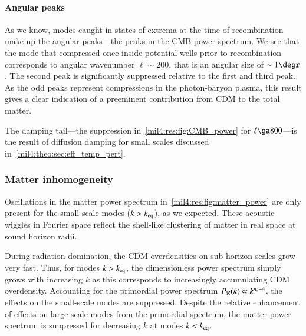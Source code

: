 





\paragraph{Angular peaks}
As we know, modes caught in states of extrema at the time of recombination make up the angular peaks---the peaks in the CMB power spectrum. We see that the mode that compressed once inside potential wells prior to recombination corresponds to angular wavenumber $\ell\sim 200$, that is an angular size of $\sim 1\degr$. The second peak is significantly suppressed relative to the first and third peak. As the odd peaks represent compressions in the photon-baryon plasma, this result gives a clear indication of a preeminent contribution from CDM to the total matter.  

The damping tail---the suppression in~\cref{mil4:res:fig:CMB_power} for $\ell\ga 800$---is the result of diffusion damping for small scales discussed in~\cref{mil4:theo:sec:eff_temp_pert}.



\subsubsection{Matter inhomogeneity}
Oscillations in the matter power spectrum in~\cref{mil4:res:fig:matter_power} are only present for the small-scale modes ($k>k_\mathrm{eq}$), as we expected. These acoustic wiggles in Fourier space reflect the shell-like clustering of matter in real space at sound horizon radii. 

During radiation domination, the CDM overdensities on sub-horizon scales grow very fast. Thus, for modes $k>k_\mathrm{eq}$, the dimensionless power spectrum simply grows with increasing $k$ as this corresponds to increasingly accumulating CDM overdensity. Accounting for the primordial power spectrum $P_\mathcal{R}(k)\propto k^{n_\mathrm{s} - 4}$, the effects on the small-scale modes are suppressed. Despite the relative enhancement of effects on large-scale modes from the primordial spectrum, the matter power spectrum is suppressed for decreasing $k$ at modes $k<k_\mathrm{eq}$. 

